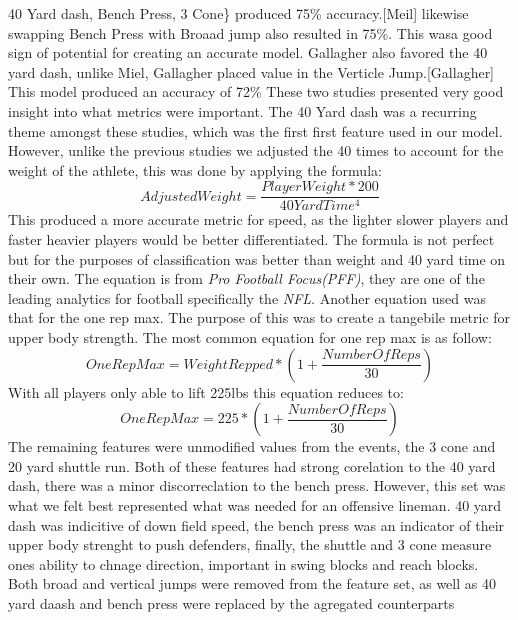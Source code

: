 \documentclass[confrence]{IEEEtran}
\begin{document}
40 Yard dash, Bench Press, 3 Cone\} produced 75\% accuracy.[Meil] likewise swapping Bench Press with Broaad jump also resulted in 75\%.
This wasa good sign of potential for creating an accurate model. 
Gallagher also favored the 40 yard dash, unlike Miel, Gallagher placed value in the Verticle Jump.[Gallagher] This model produced an accuracy of 72\%
These two studies presented very good insight into what metrics were important. 
The 40 Yard dash was a recurring theme amongst these studies, which was the first first feature used in our model.
However, unlike the previous studies we adjusted the 40 times to account for the weight of the athlete, this was done by applying the formula: 
\[
    AdjustedWeight = \frac{PlayerWeight*200}{40YardTime^4}
\]
This produced a more accurate metric for speed, as the lighter slower players and faster heavier players would be better differentiated.
The formula is not perfect but for the purposes of classification was better than weight and 40 yard time on their own. 
The equation is from \textit{Pro Football Focus(PFF)}, they are one of the leading analytics for football specifically the \textit{NFL}.
Another equation used was that for the one rep max. The purpose of this was to create a tangebile metric for upper body strength. 
The most common equation for one rep max is as follow:
\[
    OneRepMax = WeightRepped*(1+\frac{NumberOfReps}{30})
\]
With all players only able to lift 225lbs this equation reduces to:
\[
    OneRepMax = 225*(1+\frac{NumberOfReps}{30})
\]
The remaining features were unmodified values from the events, the 3 cone and 20 yard shuttle run. 
Both of these features had strong corelation to the 40 yard dash, there was a minor discorreclation to the bench press.
However, this set was what we felt best represented what was needed for an offensive lineman. 
40 yard dash was indicitive of down field speed, the bench press was an indicator of their upper body strenght to push defenders, finally, the shuttle and 3 cone measure ones ability to chnage direction, important in swing blocks and reach blocks.
Both broad and vertical jumps were removed from the feature set, as well as 40 yard daash and bench press were replaced by the agregated counterparts
\end{document}
